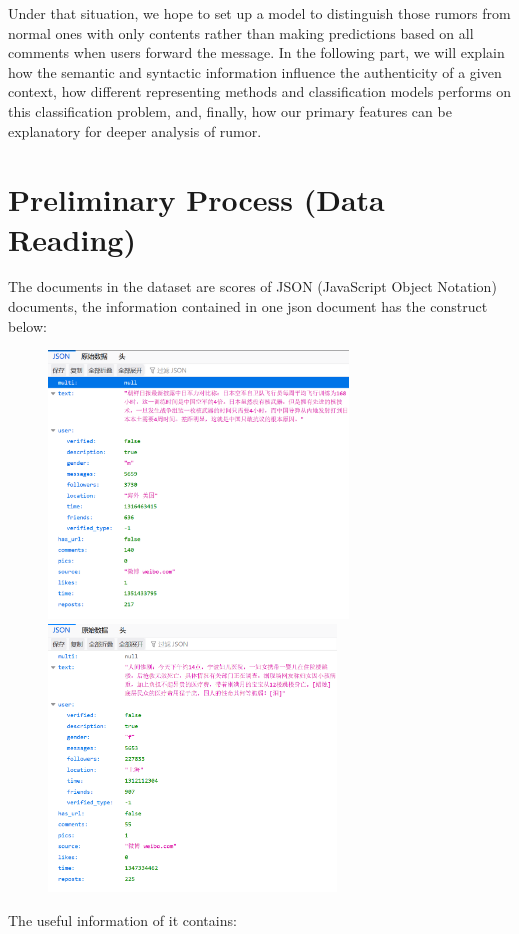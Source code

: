 \documentclass[12pt,a4paper]{article}
\begin{document}
Under that situation, we hope to set up a model to distinguish those rumors from normal ones with only contents rather than making predictions based on all comments when users forward the message. In the following part, we will explain how the semantic and syntactic information influence the authenticity of a given context, how different representing methods and classification models performs on this classification problem, and, finally, how our primary features can be explanatory for deeper analysis of rumor.

\section{Preliminary Process (Data Reading)}
The documents in the dataset are scores of JSON (JavaScript Object Notation) documents, the information contained in one json document has the construct below:

\begin{figure}[htbp]
	\centering
	\begin{minipage}{0.49\linewidth}
		\includegraphics[height=2.8in]{pic/example}
	\end{minipage}
\hfil
	\begin{minipage}{0.49\linewidth}
		\includegraphics[height=2.8in]{pic/example2}
	\end{minipage}
\end{figure}
\clearpage
The useful information of it contains:
\end{document}
